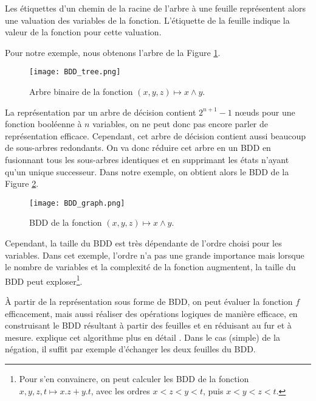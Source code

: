 Les étiquettes d'un chemin de la racine de l'arbre à une feuille représentent
alors une valuation des variables de la fonction. L'étiquette de la feuille
indique la valeur de la fonction pour cette valuation.

Pour notre exemple, nous obtenons l'arbre de la Figure \ref{fig:BDD_tree}.

\begin{figure}[ht!]
\begin{center}
  \texttt{[image: BDD\_tree.png]}
\end{center}
\caption{Arbre binaire de la fonction \((x,y,z) \mapsto x \land y\).}
\label{fig:BDD_tree}
\end{figure}

La représentation par un arbre de décision contient \(2^{n+1} - 1\) nœuds pour
une fonction booléenne à \(n\) variables, on ne peut donc pas encore parler de
représentation efficace. Cependant, cet arbre de décision contient aussi
beaucoup de sous-arbres redondants. On va donc réduire cet arbre en un \ac{BDD} en
fusionnant tous les sous-arbres identiques et en supprimant les états n'ayant
qu'un unique successeur. Dans notre exemple, on obtient alors le \ac{BDD} de la
Figure \ref{fig:BDD_graph}.

\begin{figure}[h]
\begin{center}
\texttt{[image: BDD\_graph.png]}
\end{center}
\caption{BDD de la fonction \((x,y,z) \mapsto x \land y\).}
\label{fig:BDD_graph}
\end{figure}

Cependant, la taille du \ac{BDD} est très dépendante de l'ordre choisi pour
les variables\cite{OBDD}. Dans cet exemple, l'ordre n'a pas une grande importance
mais lorsque le nombre de variables et la complexité de la fonction
augmentent, la taille du \ac{BDD} peut exploser\footnote{Pour s'en
  convaincre, on peut calculer les \ac{BDD} de la fonction
  \(x, y, z, t \mapsto x.z + y.t\), avec les ordres \(x<z<y<t\), puis
  \(x<y<z<t\).}.

À partir de la représentation sous forme de \ac{BDD}, on peut évaluer la
fonction \(f\) efficacement, mais aussi réaliser des opérations logiques
de manière efficace, en construisant le \ac{BDD} résultant à partir des
feuilles et en réduisant au fur et à mesure. \cite{OBDD} explique cet
algorithme plus en détail . Dans le cas (simple) de la
négation, il suffit par exemple d'échanger les deux feuilles du \ac{BDD}.

